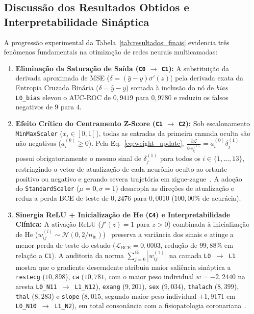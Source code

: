 ﻿\documentclass[runningheads]{llncs}
\begin{document}
\subsection{Discuss\~{a}o dos Resultados Obtidos e Interpretabilidade Sin\'{a}ptica}
A progress\~{a}o experimental da Tabela~\ref{tab:resultados_finais} evidencia tr\^{e}s fen\^{o}menos fundamentais na otimiza\c{c}\~{a}o de redes neurais multicamadas:
\begin{enumerate}
    \item \textbf{Elimina\c{c}\~{a}o da Satura\c{c}\~{a}o de Sa\'{i}da (\texttt{C0} $\to$ \texttt{C1}):} A substitui\c{c}\~{a}o da derivada aproximada de MSE ($\delta = (\hat{y}-y)\sigma'(z)$) pela derivada exata da Entropia Cruzada Bin\'{a}ria ($\delta = \hat{y}-y$) somada \`{a} inclus\~{a}o do n\'{o} de \textit{bias} \texttt{L0\_bias} elevou o AUC-ROC de $0{,}9419$ para $0{,}9780$ e reduziu os falsos negativos de $9$ para $4$.
    \item \textbf{Efeito Cr\'{i}tico do Centramento Z-Score (\texttt{C1} $\to$ \texttt{C2}):} Sob escalonamento \texttt{MinMaxScaler} ($x_i \in [0, 1]$), todas as entradas da primeira camada oculta s\~{a}o n\~{a}o-negativas ($a_i^{(0)} \ge 0$). Pela Eq.~\eqref{eq:weight_update}, $\frac{\partial \mathcal{L}}{\partial w_{ij}^{(1)}} = a_i^{(0)}\delta_j^{(1)}$ possui obrigatoriamente o mesmo sinal de $\delta_j^{(1)}$ para todos os $i \in \{1,\dots,13\}$, restringindo o vetor de atualiza\c{c}\~{a}o de cada neur\^{o}nio oculto ao ortante positivo ou negativo e gerando severa trajet\'{o}ria em zigue-zague~\cite{lecun1998efficient}. A ado\c{c}\~{a}o do \texttt{StandardScaler} ($\mu=0, \sigma=1$) desacopla as dire\c{c}\~{o}es de atualiza\c{c}\~{a}o e reduz a perda BCE de teste de $0{,}2476$ para $0{,}0010$ ($100{,}00\%$ de acur\'{a}cia).
    \item \textbf{Sinergia ReLU + Inicializa\c{c}\~{a}o de He (\texttt{C4}) e Interpretabilidade Cl\'{i}nica:} A ativa\c{c}\~{a}o ReLU ($f'(z)=1$ para $z>0$) combinada \`{a} inicializa\c{c}\~{a}o de He ($w_{ij}^{(l)} \sim \mathcal{N}(0, 2/n_{\text{in}})$)~\cite{he2015delving} preserva a vari\^{a}ncia dos sinais e atinge a menor perda de teste do estudo ($\mathcal{L}_{\text{BCE}} = 0{,}0003$, redu\c{c}\~{a}o de $99{,}88\%$ em rela\c{c}\~{a}o a \texttt{C1}). A auditoria da norma $\sum_{j=0}^{15} |w_{ij}^{(1)}|$ na camada \texttt{L0 $\to$ L1} mostra que o gradiente descendente atribuiu maior saliência sin\'{a}ptica a \texttt{restecg} ($10{,}898$), \texttt{ca} ($10{,}781$, com o maior peso individual $w = -2{,}2440$ na aresta \texttt{L0\_N11 $\to$ L1\_N12}), \texttt{exang} ($9{,}201$), \texttt{sex} ($9{,}034$), \texttt{thalach} ($8{,}399$), \texttt{thal} ($8{,}283$) e \texttt{slope} ($8{,}015$, segundo maior peso individual $+1{,}9171$ em \texttt{L0\_N10 $\to$ L1\_N2}), em total conson\^{a}ncia com a fisiopatologia coronariana~\cite{detrano1989international}.
\end{enumerate}
\end{document}
